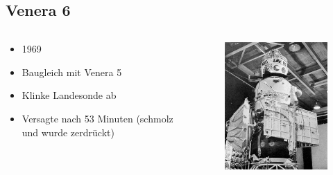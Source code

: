 \documentclass{beamer}
\begin{document}
	\subsection{Venera 6}
	\begin{frame}
		\begin{columns}
			\begin{column}{0.5\textwidth}
				\begin{itemize}
					\item 1969
					\item Baugleich mit Venera 5
					\item Klinke Landesonde ab
					\item Versagte nach 53 Minuten (schmolz und wurde zerdrückt)
				\end{itemize}
			\end{column}
			\begin{column}{0.4\textwidth}
				\begin{figure}[ht]
					\includegraphics[scale=0.4]{./images/venera_5}
				\end{figure}
			\end{column}
		\end{columns}
	\end{frame}
\end{document}
